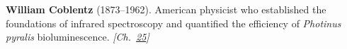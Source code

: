 \textbf{William Coblentz} (1873–1962). American physicist who established the foundations of infrared spectroscopy and quantified the efficiency of \emph{Photinus pyralis} bioluminescence. \emph{[Ch.~\hyperref[ch:fireflybioluminescence]{25}]}

